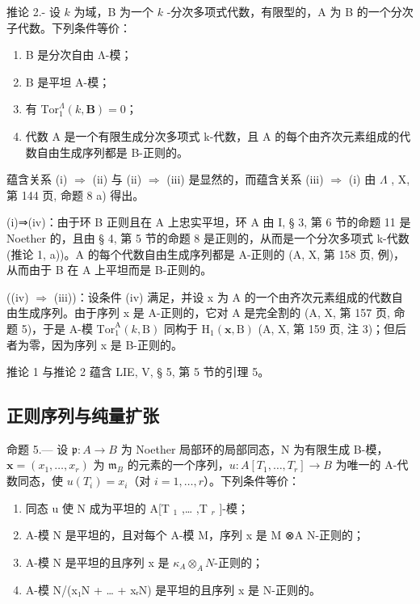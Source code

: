 推论 2.- 设 \(k\) 为域，B 为一个 \(k\) -分次多项式代数，有限型的，A 为 B 的一个分次子代数。下列条件等价：

\begin{enumerate}
\def\labelenumi{(\roman{enumi})}
\item
  B 是分次自由 Λ-模；
\item
  B 是平坦 A-模；
\item
  有 \(\mathrm{Tor}_1^\Lambda (k,\mathbf{B}) = 0\)；
\item
  代数 A 是一个有限生成分次多项式 k-代数，且 A 的每个由齐次元素组成的代数自由生成序列都是 B-正则的。
\end{enumerate}

蕴含关系 (i) \(\Rightarrow\) (ii) 与 (ii) \(\Rightarrow\) (iii) 是显然的，而蕴含关系 (iii) \(\Rightarrow\) (i) 由 \(\Lambda\) , X, 第 144 页, 命题 8 a) 得出。

(i)⇒(iv)：由于环 B 正则且在 A 上忠实平坦，环 A 由 I, § 3, 第 6 节的命题 11 是 Noether 的，且由 § 4, 第 5 节的命题 8 是正则的，从而是一个分次多项式 k-代数 (推论 1, a))。A 的每个代数自由生成序列都是 A-正则的 (A, X, 第 158 页, 例)，从而由于 B 在 A 上平坦而是 B-正则的。

((iv) \(\Rightarrow\) (iii))：设条件 (iv) 满足，并设 x 为 A 的一个由齐次元素组成的代数自由生成序列。由于序列 x 是 A-正则的，它对 A 是完全割的 (A, X, 第 157 页, 命题 5)，于是 A-模 \(\mathrm{Tor}_{1}^{\mathrm{A}}(k,\mathrm{B})\) 同构于 \(\mathrm{H}_{1}(\mathbf{x},\mathrm{B})\) (A, X, 第 159 页, 注 3)；但后者为零，因为序列 x 是 B-正则的。

推论 1 与推论 2 蕴含 LIE, V, § 5, 第 5 节的引理 5。

\subsection{正则序列与纯量扩张}

命题 5.--- 设 \(\mathfrak{p}: A \to B\) 为 Noether 局部环的局部同态，N 为有限生成 B-模，\(\mathbf{x} = (x_1, \ldots, x_r)\) 为 \(\mathfrak{m}_B\) 的元素的一个序列，\(u: A[T_1, \ldots, T_r] \longrightarrow B\) 为唯一的 A-代数同态，使 \(u(T_i) = x_i\)（对 \(i = 1, \ldots, r\)）。下列条件等价：

\begin{enumerate}
\def\labelenumi{(\roman{enumi})}
\item
  同态 u 使 N 成为平坦的 A{[}T \(_{1}\) ,\ldots{} ,T \(_{r}\) {]}-模；
\item
  A-模 N 是平坦的，且对每个 A-模 M，序列 x 是 M ⊗A N-正则的；
\item
  A-模 N 是平坦的且序列 x 是 \(\kappa_{A} \otimes_{A} N\)-正则的；
\item
  A-模 N/(x₁N + \ldots{} + xᵣN) 是平坦的且序列 x 是 N-正则的。
\end{enumerate}

